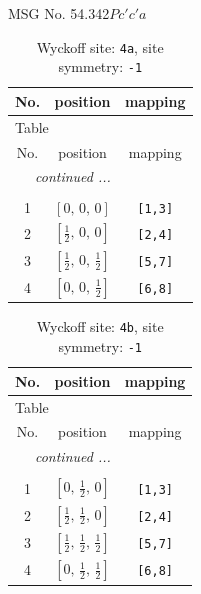 \documentclass[fleqn,8pt]{jsarticle}
\begin{document}
\setcounter{MaxMatrixCols}{32}

\renewcommand{\tablename}{Table~}
\renewcommand{\figurename}{Figure~}
\begin{center}
\LARGE
MSG No. 54.342\quad$Pc'c'a$
\end{center}
\renewcommand{\arraystretch}{1.2}
\begin{longtable}{ccc}
\caption{Wyckoff site: {\tt 4a}, site symmetry: {\tt -1}}
 \\
 \hline \hline
No. & position & mapping \\ \hline \endfirsthead

\multicolumn{2}{l}{\tablename\ \thetable{}} \\
 \hline \hline
No. & position & mapping \\ \hline \endhead

 \hline \hline
\multicolumn{2}{r}{\footnotesize\it continued ...} \\ \endfoot

 \hline \hline
\multicolumn{2}{r}{} \\ \endlastfoot

1 & $\left[ 0,\, 0,\, 0 \right]$ & {\tt [1,3]} \\ \hline
2 & $\left[ \frac{1}{2},\, 0,\, 0 \right]$ & {\tt [2,4]} \\ \hline
3 & $\left[ \frac{1}{2},\, 0,\, \frac{1}{2} \right]$ & {\tt [5,7]} \\ \hline
4 & $\left[ 0,\, 0,\, \frac{1}{2} \right]$ & {\tt [6,8]} \\
\end{longtable}
\renewcommand{\arraystretch}{1.2}
\begin{longtable}{ccc}
\caption{Wyckoff site: {\tt 4b}, site symmetry: {\tt -1}}
 \\
 \hline \hline
No. & position & mapping \\ \hline \endfirsthead

\multicolumn{2}{l}{\tablename\ \thetable{}} \\
 \hline \hline
No. & position & mapping \\ \hline \endhead

 \hline \hline
\multicolumn{2}{r}{\footnotesize\it continued ...} \\ \endfoot

 \hline \hline
\multicolumn{2}{r}{} \\ \endlastfoot

1 & $\left[ 0,\, \frac{1}{2},\, 0 \right]$ & {\tt [1,3]} \\ \hline
2 & $\left[ \frac{1}{2},\, \frac{1}{2},\, 0 \right]$ & {\tt [2,4]} \\ \hline
3 & $\left[ \frac{1}{2},\, \frac{1}{2},\, \frac{1}{2} \right]$ & {\tt [5,7]} \\ \hline
4 & $\left[ 0,\, \frac{1}{2},\, \frac{1}{2} \right]$ & {\tt [6,8]} \\
\end{longtable}
\end{document}
